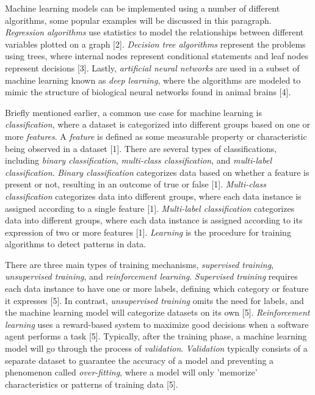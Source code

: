 \documentclass[11pt,conference]{IEEEtran}
\begin{document}
Machine learning models can be implemented using a number of different
algorithms, some popular examples will be discussed in this paragraph. \emph{Regression algorithms} use statistics to model the
relationships between different variables plotted on a graph [2]. \emph{Decision
tree algorithms} represent the problems using trees, where internal nodes represent conditional statements and leaf nodes
represent decisions [3]. Lastly, \emph{artificial neural networks} are used in a
subset of machine learning known as \emph{deep learning}, where the algorithms
are modeled to mimic the structure of biological neural networks found in
animal brains [4].  

Briefly mentioned earlier, a common use case for machine learning is
\emph{classification}, where a dataset is categorized into different groups
based on one or more \emph{features}. A \emph{feature} is defined as some
measurable property or characteristic being observed in a dataset [1]. There are several types of
classifications, including \emph{binary classification}, \emph{multi-class
classification}, and \emph{multi-label classification}. \emph{Binary
classification} categorizes data based on whether a feature is present or not,
resulting in an outcome of true or false [1]. \emph{Multi-class classification}
categorizes data into different groups, where each data instance is assigned
according to a single feature [1]. \emph{Multi-label classification} categorizes data
into different groups, where each data instance is assigned according to its
expression of two or more features [1].
\emph{Learning} is the procedure for training algorithms to detect patterns in
data. 

There are three main types of training mechanisms, \emph{supervised
training}, \emph{unsupervised training}, and \emph{reinforcement learning}. \emph{Supervised training} requires
each data instance to have one or more labels, defining which category or
feature it expresses [5]. In contrast, \emph{unsupervised training} omits the need
for labels, and the machine learning model will categorize datasets on its own
[5].
\emph{Reinforcement learning} uses a reward-based system to maximize good
decisions when a software agent performs a task [5].
Typically, after the training phase, a machine learning model will go through
the process of \emph{validation}. \emph{Validation} typically consists of a separate dataset to guarantee the accuracy of a model and
preventing a phenomenon called \emph{over-fitting}, where a model will only
'memorize' characteristics or patterns of training data [5].
\end{document}
